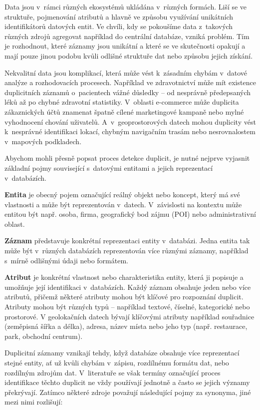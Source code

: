 Data jsou v~rámci různých ekosystémů ukládána v~různých formách. Liší se ve struktuře, pojmenování atributů a hlavně ve způsobu využívání unikátních identifikátorů datových entit. Ve chvíli, kdy se pokoušíme data z~takových různých zdrojů agregovat například do centrální databáze, vzniká problém. Tím je rozhodnout, které záznamy jsou unikátní a které se ve skutečnosti opakují a mají pouze jinou podobu kvůli odlišné struktuře dat nebo způsobu jejich získání.

Nekvalitní data jsou komplikací, která může vést k~zásadním chybám v~datové analýze a rozhodovacích procesech. Například ve zdravotnictví může mít existence duplicitních záznamů o~pacientech vážné důsledky – od nesprávně předepsaných léků až po chybné zdravotní statistiky.\cite{bess_problem_2024} V~oblasti e-commerce může duplicita zákaznických účtů znamenat špatně cílené marketingové kampaně nebo mylné vyhodnocení chování uživatelů.\cite{brown_8_2019} A~v~geoprostorových datech mohou duplicity vést k~nesprávné identifikaci lokací, chybným navigačním trasám nebo nesrovnalostem v~mapových podkladech.

Abychom mohli přesně popsat proces detekce duplicit, je nutné nejprve vyjasnit základní pojmy související s~datovými entitami a jejich reprezentací v~databázích.

\textbf{Entita} je obecný pojem označující reálný objekt nebo koncept, který má své vlastnosti a může být reprezentován v~datech. V~závislosti na kontextu může entitou být např. osoba, firma, geografický bod zájmu (POI) nebo administrativní oblast.

\textbf{Záznam} představuje konkrétní reprezentaci entity v~databázi. Jedna entita tak může být v~různých databázích reprezentován více různými záznamy, například s~mírně odlišnými údaji nebo formátem.

\textbf{Atribut} je konkrétní vlastnost nebo charakteristika entity, která ji popisuje a umožňuje její identifikaci v~databázích. Každý záznam obsahuje jeden nebo více atributů, přičemž některé atributy mohou být klíčové pro rozpoznání duplicit.
Atributy mohou být různých typů – například textové, číselné, kategorické nebo prostorové. V geolokačních datech bývají klíčovými atributy například souřadnice (zeměpisná šířka a délka), adresa, název místa nebo jeho typ (např. restaurace, park, obchodní centrum).

Duplicitní záznamy vznikají tehdy, když databáze obsahuje více reprezentací stejné entity, ať už kvůli chybám v~zápisu, rozdílnému formátu dat, nebo rozdílným zdrojům dat. V~literatuře se však termíny označující proces identifikace těchto duplicit ne vždy používají jednotně a často se jejich významy překrývají. Zatímco některé zdroje považují následující pojmy za synonyma, jiné mezi nimi rozlišují:

